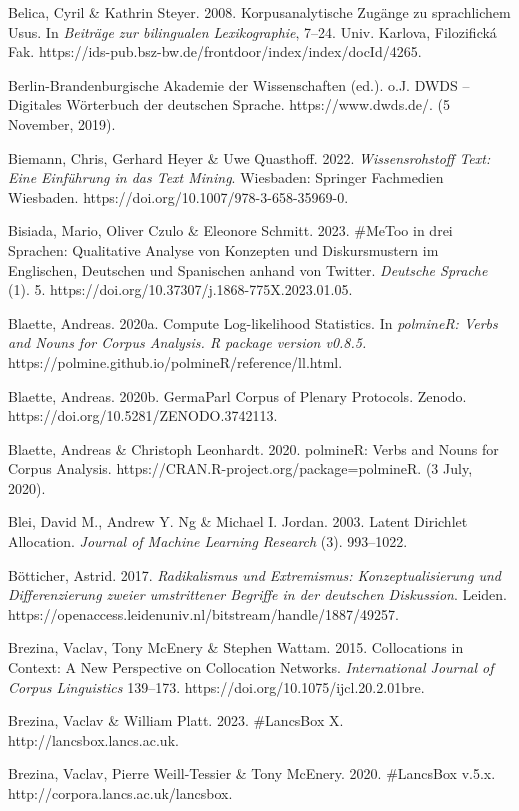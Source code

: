 Belica, Cyril \& Kathrin Steyer. 2008. Korpusanalytische Zugänge zu sprachlichem Usus. In \emph{Beiträge zur bilingualen Lexikographie}, 7--24. Univ. Karlova, Filozifická Fak. https://ids-pub.bsz-bw.de/frontdoor/index/index/docId/4265.

Berlin-Brandenburgische Akademie der Wissenschaften (ed.). o.J. DWDS -- Digitales Wörterbuch der deutschen Sprache. https://www.dwds.de/. (5 November, 2019).

Biemann, Chris, Gerhard Heyer \& Uwe Quasthoff. 2022. \emph{Wissensrohstoff Text: Eine Einführung in das Text Mining}. Wiesbaden: Springer Fachmedien Wiesbaden. https://doi.org/10.1007/978-3-658-35969-0.

Bisiada, Mario, Oliver Czulo \& Eleonore Schmitt. 2023. \#MeToo in drei Sprachen: Qualitative Analyse von Konzepten und Diskursmustern im Englischen, Deutschen und Spanischen anhand von Twitter. \emph{Deutsche Sprache} (1). 5. https://doi.org/10.37307/j.1868-775X.2023.01.05.

Blaette, Andreas. 2020a. Compute Log-likelihood Statistics. In \emph{polmineR: Verbs and Nouns for Corpus Analysis. R package version v0.8.5.} https://polmine.github.io/polmineR/reference/ll.html.

Blaette, Andreas. 2020b. GermaParl Corpus of Plenary Protocols. Zenodo. https://doi.org/10.5281/ZENODO.3742113.

Blaette, Andreas \& Christoph Leonhardt. 2020. polmineR: Verbs and Nouns for Corpus Analysis. https://CRAN.R-project.org/package=polmineR. (3 July, 2020).

Blei, David M., Andrew Y. Ng \& Michael I. Jordan. 2003. Latent Dirichlet Allocation. \emph{Journal of Machine Learning Research} (3). 993--1022.

Bötticher, Astrid. 2017. \emph{Radikalismus und Extremismus: Konzeptualisierung und Differenzierung zweier umstrittener Begriffe in der deutschen Diskussion}. Leiden. https://openaccess.leidenuniv.nl/bitstream/handle/1887/49257.

Brezina, Vaclav, Tony McEnery \& Stephen Wattam. 2015. Collocations in Context: A New Perspective on Collocation Networks. \emph{International Journal of Corpus Linguistics} 139--173. https://doi.org/10.1075/ijcl.20.2.01bre.

Brezina, Vaclav \& William Platt. 2023. \#LancsBox X. http://lancsbox.lancs.ac.uk.

Brezina, Vaclav, Pierre Weill-Tessier \& Tony McEnery. 2020. \#LancsBox v.5.x. http://corpora.lancs.ac.uk/lancsbox.

